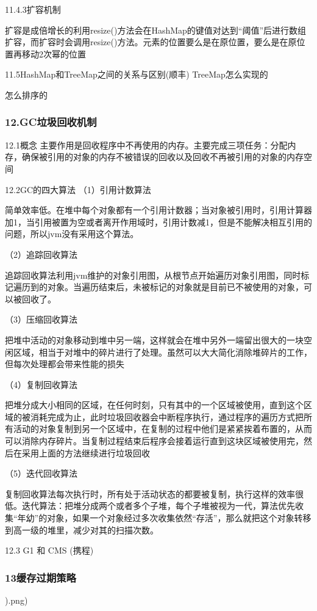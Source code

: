 \documentclass[UTF8]{ctexart}
\begin{document}
11.4.3扩容机制

扩容是成倍增长的利用resize()方法会在HashMap的键值对达到“阈值”后进行数组扩容，而扩容时会调用resize()方法。元素的位置要么是在原位置，要么是在原位置再移动2次幂的位置

11.5HashMap和TreeMap之间的关系与区别(顺丰)
TreeMap怎么实现的

怎么排序的

\subsubsection{12.GC垃圾回收机制}
12.1概念
主要作用是回收程序中不再使用的内存。主要完成三项任务：分配内存，确保被引用的对象的内存不被错误的回收以及回收不再被引用的对象的内存空间

12.2GC的四大算法
（1）引用计数算法

简单效率低。在堆中每个对象都有一个引用计数器；当对象被引用时，引用计算器加1，当引用被置为空或者离开作用域时，引用计数减1，但是不能解决相互引用的问题，所以jvm没有采用这个算法。

（2）追踪回收算法

追踪回收算法利用jvm维护的对象引用图，从根节点开始遍历对象引用图，同时标记遍历到的对象。当遍历结束后，未被标记的对象就是目前已不被使用的对象，可以被回收了。

（3）压缩回收算法

把堆中活动的对象移动到堆中另一端，这样就会在堆中另外一端留出很大的一块空闲区域，相当于对堆中的碎片进行了处理。虽然可以大大简化消除堆碎片的工作，但每次处理都会带来性能的损失

（4）复制回收算法

把堆分成大小相同的区域，在任何时刻，只有其中的一个区域被使用，直到这个区域的被消耗完成为止，此时垃圾回收器会中断程序执行，通过程序的遍历方式把所有活动的对象复制到另一个区域中，在复制的过程中他们是紧紧挨着布置的，从而可以消除内存碎片。当复制过程结束后程序会接着运行直到这块区域被使用完，然后在采用上面的方法继续进行垃圾回收

（5）迭代回收算法

复制回收算法每次执行时，所有处于活动状态的都要被复制，执行这样的效率很低。迭代算法：把堆分成两个或者多个子堆，每个子堆被视为一代，算法优先收集“年幼”的对象，如果一个对象经过多次收集依然“存活”，那么就把这个对象转移到高一级的堆里，减少对其的扫描次数。

12.3 G1 和 CMS (携程)
\subsubsection{13缓存过期策略}
).png)
\end{document}
